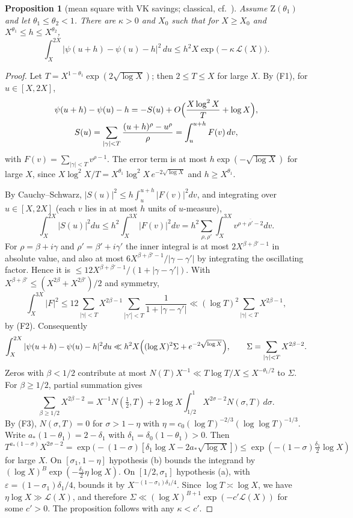 \documentclass[11pt,a4paper]{article}
\newtheorem{proposition}[theorem]{Proposition}
\theoremstyle{definition}
\newcommand{\eps}{\varepsilon}
\begin{document}
\begin{proposition}[mean square with VK savings; classical, cf.\ \cite{SV77,Zac98,BP00,GT25}]\label{prop:ms}
Assume $\mathrm Z(\theta_1)$ and let $\theta_1\le\theta_2<1$. There are $\kappa>0$ and $X_0$ such that for
$X\ge X_0$ and $X^{\theta_1}\le h\le X^{\theta_2}$,
\[
 \int_X^{2X}\bigl|\psi(u+h)-\psi(u)-h\bigr|^2\,du\le h^2X\exp\bigl(-\kappa\,\mathcal L(X)\bigr).
\]
\end{proposition}

\begin{proof}
Let $T=X^{1-\theta_1}\exp(2\sqrt{\log X})$; then $2\le T\le X$ for large $X$. By (F1), for $u\in[X,2X]$,
\begin{gather*}
 \psi(u+h)-\psi(u)-h=-S(u)+O\Bigl(\frac{X\log^2X}{T}+\log X\Bigr),\\
 S(u)=\sum_{|\gamma|<T}\frac{(u+h)^\rho-u^\rho}{\rho}=\int_u^{u+h}F(v)\,dv,
\end{gather*}
with $F(v)=\sum_{|\gamma|<T}v^{\rho-1}$. The error term is at most $h\exp(-\sqrt{\log X})$ for large $X$, since
$X\log^2X/T=X^{\theta_1}\log^2X\,e^{-2\sqrt{\log X}}$ and $h\ge X^{\theta_1}$.

By Cauchy--Schwarz, $|S(u)|^2\le h\int_u^{u+h}|F(v)|^2dv$, and integrating over $u\in[X,2X]$ (each $v$ lies
in at most $h$ units of $u$-measure),
\[
 \int_X^{2X}|S(u)|^2du\le h^2\int_X^{3X}|F(v)|^2dv=h^2\sum_{\rho,\rho'}\int_X^{3X}v^{\rho+\overline{\rho'}-2}dv .
\]
For $\rho=\beta+i\gamma$ and $\rho'=\beta'+i\gamma'$ the inner integral is at most $2X^{\beta+\beta'-1}$ in
absolute value, and also at most $6X^{\beta+\beta'-1}/|\gamma-\gamma'|$ by integrating the oscillating factor.
Hence it is $\le12X^{\beta+\beta'-1}/(1+|\gamma-\gamma'|)$. With $X^{\beta+\beta'}\le(X^{2\beta}+X^{2\beta'})/2$
and symmetry,
\[
 \int_X^{3X}|F|^2\le 12\sum_{|\gamma|<T}X^{2\beta-1}\sum_{|\gamma'|<T}\frac1{1+|\gamma-\gamma'|}
 \ll(\log T)^2\sum_{|\gamma|<T}X^{2\beta-1},
\]
by (F2). Consequently
\[
 \int_X^{2X}|\psi(u+h)-\psi(u)-h|^2du\ll h^2X\Bigl((\log X)^2\Sigma+e^{-2\sqrt{\log X}}\Bigr),
 \qquad \Sigma=\sum_{|\gamma|<T}X^{2\beta-2}.
\]
Zeros with $\beta<1/2$ contribute at most $N(T)X^{-1}\ll T\log T/X\le X^{-\theta_1/2}$ to $\Sigma$.
For $\beta\ge1/2$, partial summation gives
\[
 \sum_{\beta\ge1/2}X^{2\beta-2}=X^{-1}N(\tfrac12,T)+2\log X\int_{1/2}^1X^{2\sigma-2}N(\sigma,T)\,d\sigma .
\]
By (F3), $N(\sigma,T)=0$ for $\sigma>1-\eta$ with $\eta=c_0(\log T)^{-2/3}(\log\log T)^{-1/3}$.
Write $a_*(1-\theta_1)=2-\delta_1$ with $\delta_1=\delta_0(1-\theta_1)>0$. Then
$T^{a_*(1-\sigma)}X^{2\sigma-2}=\exp\bigl(-(1-\sigma)[\delta_1\log X-2a_*\sqrt{\log X}]\bigr)
\le\exp(-(1-\sigma)\tfrac{\delta_1}{2}\log X)$ for large $X$.
On $[\sigma_1,1-\eta]$ hypothesis (b) bounds the integrand by $(\log X)^B\exp(-\tfrac{\delta_1}{2}\eta\log X)$.
On $[1/2,\sigma_1]$ hypothesis (a), with $\eps=(1-\sigma_1)\delta_1/4$, bounds it by $X^{-(1-\sigma_1)\delta_1/4}$.
Since $\log T\asymp\log X$, we have $\eta\log X\gg\mathcal L(X)$, and therefore
$\Sigma\ll(\log X)^{B+1}\exp(-c'\mathcal L(X))$ for some $c'>0$. The proposition follows with any
$\kappa<c'$.
\end{proof}
\end{document}
